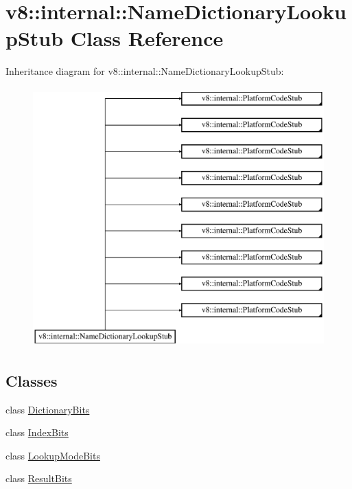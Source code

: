 \hypertarget{classv8_1_1internal_1_1_name_dictionary_lookup_stub}{}\section{v8\+:\+:internal\+:\+:Name\+Dictionary\+Lookup\+Stub Class Reference}
\label{classv8_1_1internal_1_1_name_dictionary_lookup_stub}
Inheritance diagram for v8\+:\+:internal\+:\+:Name\+Dictionary\+Lookup\+Stub\+:\begin{figure}[H]
\begin{center}
\leavevmode
\includegraphics[height=10.000000cm]{classv8_1_1internal_1_1_name_dictionary_lookup_stub}
\end{center}
\end{figure}
\subsection*{Classes}
\begin{DoxyCompactItemize}
\item 
class \hyperlink{classv8_1_1internal_1_1_name_dictionary_lookup_stub_1_1_dictionary_bits}{Dictionary\+Bits}
\item 
class \hyperlink{classv8_1_1internal_1_1_name_dictionary_lookup_stub_1_1_index_bits}{Index\+Bits}
\item 
class \hyperlink{classv8_1_1internal_1_1_name_dictionary_lookup_stub_1_1_lookup_mode_bits}{Lookup\+Mode\+Bits}
\item 
class \hyperlink{classv8_1_1internal_1_1_name_dictionary_lookup_stub_1_1_result_bits}{Result\+Bits}
\end{DoxyCompactItemize}
